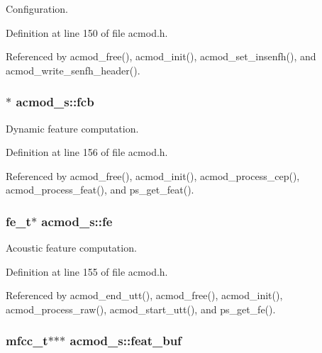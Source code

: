 \-Configuration. 



\-Definition at line 150 of file acmod.\-h.



\-Referenced by acmod\-\_\-free(), acmod\-\_\-init(), acmod\-\_\-set\-\_\-insenfh(), and acmod\-\_\-write\-\_\-senfh\-\_\-header().

\subsubsection[{fcb}]{$\ast$ {\bf acmod\-\_\-s\-::fcb}}\label{structacmod__s_a37ec6c2b1f3ada764842e08481239b34}


\-Dynamic feature computation. 



\-Definition at line 156 of file acmod.\-h.



\-Referenced by acmod\-\_\-free(), acmod\-\_\-init(), acmod\-\_\-process\-\_\-cep(), acmod\-\_\-process\-\_\-feat(), and ps\-\_\-get\-\_\-feat().

\subsubsection[{fe}]{\setlength{\rightskip}{0pt plus 5cm}fe\-\_\-t$\ast$ {\bf acmod\-\_\-s\-::fe}}\label{structacmod__s_a56eaceb9b6a1cbcccd09cf42cfa87231}


\-Acoustic feature computation. 



\-Definition at line 155 of file acmod.\-h.



\-Referenced by acmod\-\_\-end\-\_\-utt(), acmod\-\_\-free(), acmod\-\_\-init(), acmod\-\_\-process\-\_\-raw(), acmod\-\_\-start\-\_\-utt(), and ps\-\_\-get\-\_\-fe().

\subsubsection[{feat\-\_\-buf}]{\setlength{\rightskip}{0pt plus 5cm}mfcc\-\_\-t$\ast$$\ast$$\ast$ {\bf acmod\-\_\-s\-::feat\-\_\-buf}}\label{structacmod__s_afc52cc0151f6c7e32a230576141d20a3}


